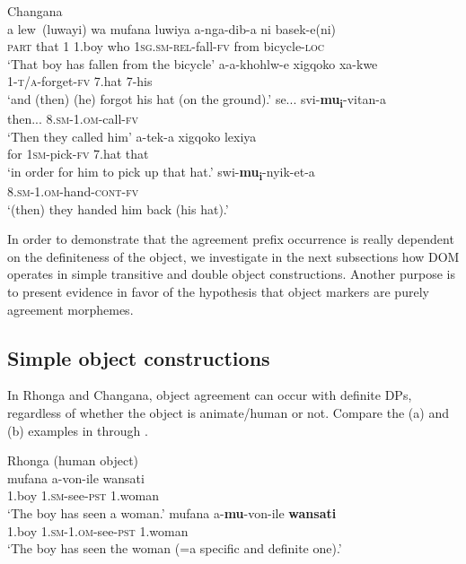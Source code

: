 \documentclass[output=paper]{langsci/langscibook}
\begin{document}
\ea\label{ex:nguna:17}
{Changana}\\
\ea\label{ex:nguna:17a}
\gll a         lew~(luwayi)  wa    mufana   luwiya    a-nga-dib-a    ni          basek-e(ni)\\
     \textsc{part}    that                 1      1.boy       who       \textsc{1sg.sm-rel}-fall-\textsc{fv}  from     bicycle-\textsc{loc}\\
\glt ‘That boy has fallen from the bicycle’
\ex\label{ex:nguna:17b} 
\gll a-a-khohlw-e               xigqoko          xa-kwe\\
     1-\textsc{t/a}-forget-\textsc{fv}           7.hat                7-his\\
\glt ‘and (then) (he) forgot his hat (on the ground).’
\ex\label{ex:nguna:17c}
\gll se...         svi-\textbf{mu}\textbf{\textup{\textsubscript{i}}}-vitan-a\\
     then...     8.\textsc{sm-1.om}-call-\textsc{fv}\\
\glt ‘Then they called him’
\ex\label{ex:nguna:17d}
       a-tek-a              xigqoko       lexiya\\
     for             1\textsc{sm}-pick-\textsc{fv}      7.hat             that\\
\glt ‘in order for him to pick up that hat.’
\ex\label{ex:nguna:17e}
\gll swi-\textbf{mu}\textbf{\textup{\textsubscript{i}}}-nyik-et-a\\
     8.\textsc{sm}-1.\textsc{om}-hand-\textsc{cont}-\textsc{fv}\\
\glt ‘(then) they handed him back (his hat).’
\z
\z

{In order to demonstrate that the agreement prefix occurrence is really dependent on the definiteness of the object, we investigate in the next subsections how DOM operates in simple transitive and double object constructions. Another purpose is to present evidence in favor of the hypothesis that object markers are purely agreement morphemes.}
\subsection{Simple object constructions}\label{sec:nguna:4.1}

In Rhonga and Changana, object agreement can occur with definite DPs, regardless of whether the object is animate/human or not. Compare the (a) and (b) examples in  through .


\ea\label{ex:nguna:18} {Rhonga (human object)}\\
\ea
\gll mufana         a-von-ile                  wansati\\
     1.boy           1.\textsc{sm}-see-\textsc{pst}            1.woman\\
\glt ‘The boy has seen a woman.’
\ex\label{ex:nguna: }
\gll mufana    a-\textbf{mu}-von-ile             \textbf{wansati}\\
     1.boy     1\textsc{.sm-1.om}-see-\textsc{pst}     1.woman\\
\glt ‘The boy has seen the woman (=a specific and definite one).’
\z
\z
\end{document}
